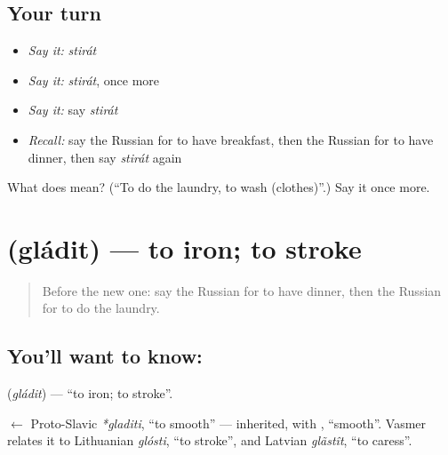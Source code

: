 \subsection*{Your turn}
\begin{itemize}
\raggedright
  \item \emph{Say it:} \emph{stirát}
  \item \emph{Say it:} \emph{stirát}, once more
  \item \emph{Say it:} say \emph{stirát}
  \item \emph{Recall:} say the Russian for to have breakfast, then the Russian for to have dinner, then say \emph{stirát} again
\end{itemize}

\begin{tcolorbox}[breakable,colback=teal!4,colframe=teal!35!black,title={Before you move on}]
What does  mean? (\textquotedblleft{}To do the laundry, to wash (clothes)\textquotedblright{}.) Say it once more.
\end{tcolorbox}
\section[\texorpdfstring{\ru{гладить} (gládit)}{гладить (gládit)}]{ (gládit) — to iron; to stroke}

\label{lesson:RU-C140-gladit}



\begin{quote}
Before the new one: say the Russian for to have dinner, then the Russian for to do the laundry.
\end{quote}

\subsection*{You'll want to know: }
\textbf{} (\emph{gládit}) — \textquotedblleft{}to iron; to stroke\textquotedblright{}.

\begin{cousinweb}
\textbf{} $\leftarrow$ Proto-Slavic \emph{*gladiti}, \textquotedblleft{}to smooth\textquotedblright{} — inherited, with \emph{}, \textquotedblleft{}smooth\textquotedblright{}. Vasmer relates it to Lithuanian \emph{glósti}, \textquotedblleft{}to stroke\textquotedblright{}, and Latvian \emph{glãstît}, \textquotedblleft{}to caress\textquotedblright{}.
\end{cousinweb}

